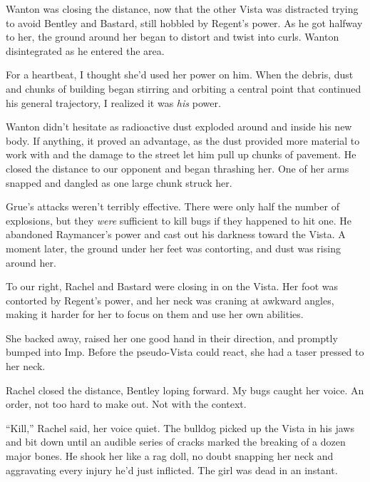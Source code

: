 Wanton was closing the distance, now that the other Vista was distracted trying to avoid Bentley and Bastard, still hobbled by Regent's power.  As he got halfway to her, the ground around her began to distort and twist into curls.  Wanton disintegrated as he entered the area.



For a heartbeat, I thought she'd used her power on him.  When the debris, dust and chunks of building began stirring and orbiting a central point that continued his general trajectory, I realized it was \emph{his} power.



Wanton didn't hesitate as radioactive dust exploded around and inside his new body.  If anything, it proved an advantage, as the dust provided more material to work with and the damage to the street let him pull up chunks of pavement.  He closed the distance to our opponent and began thrashing her.  One of her arms snapped and dangled as one large chunk struck her.



Grue's attacks weren't terribly effective.  There were only half the number of explosions, but they \emph{were} sufficient to kill bugs if they happened to hit one.  He abandoned Raymancer's power and cast out his darkness toward the Vista.  A moment later, the ground under her feet was contorting, and dust was rising around her.



To our right, Rachel and Bastard were closing in on the Vista.  Her foot was contorted by Regent's power, and her neck was craning at awkward angles, making it harder for her to focus on them and use her own abilities.



She backed away, raised her one good hand in their direction, and promptly bumped into Imp.  Before the pseudo-Vista could react, she had a taser pressed to her neck.



Rachel closed the distance, Bentley loping forward.  My bugs caught her voice.  An order, not too hard to make out.  Not with the context.



``Kill,'' Rachel said, her voice quiet.  The bulldog picked up the Vista in his jaws and bit down until an audible series of cracks marked the breaking of a dozen major bones.  He shook her like a rag doll, no doubt snapping her neck and aggravating every injury he'd just inflicted.  The girl was dead in an instant.



